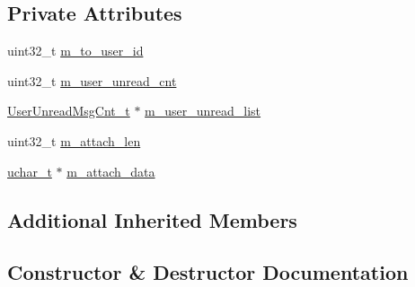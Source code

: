 \subsection*{Private Attributes}
\begin{DoxyCompactItemize}
\item 
uint32\+\_\+t \hyperlink{class_c_im_pdu_unread_msg_count_response_a6646c19134314cb58f18c7a1de814e31}{m\+\_\+to\+\_\+user\+\_\+id}
\item 
uint32\+\_\+t \hyperlink{class_c_im_pdu_unread_msg_count_response_a42812fda968e627808329ecc3029eb0b}{m\+\_\+user\+\_\+unread\+\_\+cnt}
\item 
\hyperlink{struct_user_unread_msg_cnt__t}{User\+Unread\+Msg\+Cnt\+\_\+t} $\ast$ \hyperlink{class_c_im_pdu_unread_msg_count_response_a80cc124bb9bf22717610b827e16dc588}{m\+\_\+user\+\_\+unread\+\_\+list}
\item 
uint32\+\_\+t \hyperlink{class_c_im_pdu_unread_msg_count_response_a087ca5620e0c389a981b6c0bd1e2cc23}{m\+\_\+attach\+\_\+len}
\item 
\hyperlink{base_2ostype_8h_a124ea0f8f4a23a0a286b5582137f0b8d}{uchar\+\_\+t} $\ast$ \hyperlink{class_c_im_pdu_unread_msg_count_response_a9d5106bc90e839cb898300686f2414cc}{m\+\_\+attach\+\_\+data}
\end{DoxyCompactItemize}
\subsection*{Additional Inherited Members}


\subsection{Constructor \& Destructor Documentation}
\hypertarget{class_c_im_pdu_unread_msg_count_response_a9ce8053da15af00ea48740257c0e2ca3}{}
